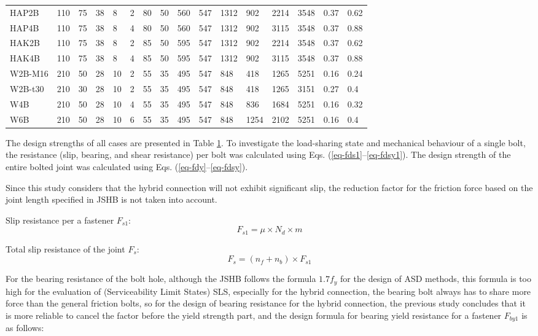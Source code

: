 \begin{table}[htbp]
\begin{tabular}{@{}llllllllllllllll@{}}
HAP2B & 110 & 75 & 38 & 8 & 2 & 80 & 50 & 560 & 547 & 1312 & 902 & 2214 & 3548 & 0.37 & 0.62 \\
HAP4B & 110 & 75 & 38 & 8 & 4 & 80 & 50 & 560 & 547 & 1312 & 902 & 3115 & 3548 & 0.37 & 0.88 \\
HAK2B & 110 & 75 & 38 & 8 & 2 & 85 & 50 & 595 & 547 & 1312 & 902 & 2214 & 3548 & 0.37 & 0.62 \\
HAK4B & 110 & 75 & 38 & 8 & 4 & 85 & 50 & 595 & 547 & 1312 & 902 & 3115 & 3548 & 0.37 & 0.88 \\
W2B-M16 & 210 & 50 & 28 & 10 & 2 & 55 & 35 & 495 & 547 & 848 & 418 & 1265 & 5251 & 0.16 & 0.24 \\
W2B-t30 & 210 & 30 & 28 & 10 & 2 & 55 & 35 & 495 & 547 & 848 & 418 & 1265 & 3151 & 0.27 & 0.4 \\
W4B & 210 & 50 & 28 & 10 & 4 & 55 & 35 & 495 & 547 & 848 & 836 & 1684 & 5251 & 0.16 & 0.32 \\
W6B & 210 & 50 & 28 & 10 & 6 & 55 & 35 & 495 & 547 & 848 & 1254 & 2102 & 5251 & 0.16 & 0.4 \\ \bottomrule
\end{tabular}
\label{tab-allcase}
\end{table}

The design strengths of all cases are presented in Table \ref{tab-allcase}. To investigate the load-sharing state and mechanical behaviour of a single bolt, the resistance (slip, bearing, and shear resistance) per bolt was calculated using Eqs. (\ref{eq-fds1}–\ref{eq-fdsy1}). The design strength of the entire bolted joint was calculated using Eqs. (\ref{eq-fdy}–\ref{eq-fdsy}). 

Since this study considers that the hybrid connection will not exhibit significant slip, the reduction factor for the friction force based on the joint length specified in JSHB \cite{douji2017} is not taken into account.

\noindent Slip resistance per a fastener $F_{s1}$:
\begin{equation}
    \label{eq-fds1}
    F_{s1} = \mu \times N_d \times m
\end{equation}

\noindent Total slip resistance of the joint $F_{s}$:
\begin{equation}
    \label{eq-fds}
    F_{s} = (n_f+n_b) \times F_{s1}
\end{equation}

For the bearing resistance of the bolt hole, although the JSHB follows the formula $1. 7f_y$ for the design of ASD methods, this formula is too high for the evaluation of (Serviceability Limit States) SLS, especially for the hybrid connection, the bearing bolt always has to share more force than the general friction bolts, so for the design of bearing resistance for the hybrid connection, the previous study concludes \cite{chen2023mecha} that it is more reliable to cancel the factor before the yield strength part, and the design formula for bearing yield resistance for a fastener $F_{by1}$ is as follows:

